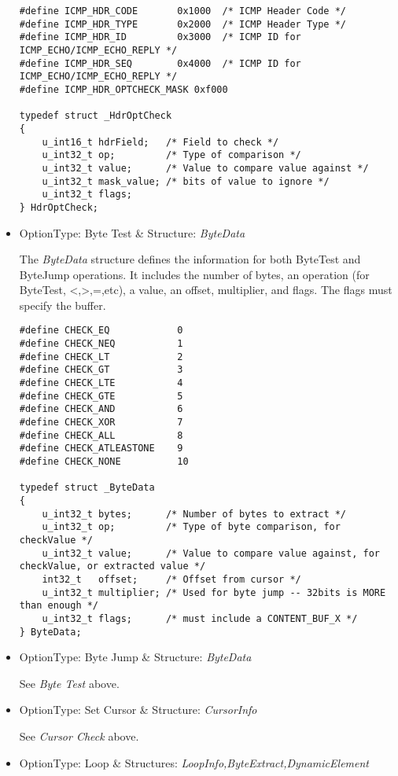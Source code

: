 \documentclass[english]{report}
\begin{document}
\begin{itemize}
\begin{verbatim}
#define ICMP_HDR_CODE       0x1000  /* ICMP Header Code */
#define ICMP_HDR_TYPE       0x2000  /* ICMP Header Type */
#define ICMP_HDR_ID         0x3000  /* ICMP ID for ICMP_ECHO/ICMP_ECHO_REPLY */
#define ICMP_HDR_SEQ        0x4000  /* ICMP ID for ICMP_ECHO/ICMP_ECHO_REPLY */
#define ICMP_HDR_OPTCHECK_MASK 0xf000

typedef struct _HdrOptCheck
{
    u_int16_t hdrField;   /* Field to check */
    u_int32_t op;         /* Type of comparison */
    u_int32_t value;      /* Value to compare value against */
    u_int32_t mask_value; /* bits of value to ignore */
    u_int32_t flags;
} HdrOptCheck;
\end{verbatim}

\item {OptionType: Byte Test \& Structure: {\em ByteData}}

The {\em ByteData} structure defines the information for both
ByteTest and ByteJump operations.  It includes the number of
bytes, an operation (for ByteTest, <,>,=,etc), a value,
an offset, multiplier, and flags.  The flags must specify the
buffer.

\begin{verbatim}
#define CHECK_EQ            0
#define CHECK_NEQ           1
#define CHECK_LT            2
#define CHECK_GT            3
#define CHECK_LTE           4
#define CHECK_GTE           5
#define CHECK_AND           6
#define CHECK_XOR           7
#define CHECK_ALL           8
#define CHECK_ATLEASTONE    9
#define CHECK_NONE          10

typedef struct _ByteData
{
    u_int32_t bytes;      /* Number of bytes to extract */
    u_int32_t op;         /* Type of byte comparison, for checkValue */
    u_int32_t value;      /* Value to compare value against, for checkValue, or extracted value */
    int32_t   offset;     /* Offset from cursor */
    u_int32_t multiplier; /* Used for byte jump -- 32bits is MORE than enough */
    u_int32_t flags;      /* must include a CONTENT_BUF_X */
} ByteData;
\end{verbatim}

\item {OptionType: Byte Jump \& Structure: {\em ByteData}}

See {\em Byte Test} above.

\item {OptionType: Set Cursor \& Structure: {\em CursorInfo}}

See {\em Cursor Check} above.

\item {OptionType: Loop \& Structures: {\em LoopInfo,ByteExtract,DynamicElement}}


\end{itemize}
\end{document}
